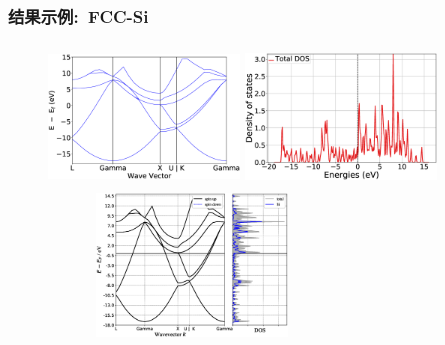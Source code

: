 \documentclass[cjk,slidestop,handout,compress,mathserif,blue]{beamer}	%
\begin{document}
\frame
{
	\frametitle{\textrm{结果示例:~\textrm{FCC-Si}}}
\begin{figure}[h!]
\centering
\vspace*{-0.25in}
\includegraphics[height=1.5in,width=2.0in,viewport=0 0 880 600,clip]{Figures/FCC_Si-Band_pymatgen.eps}
\includegraphics[height=1.5in,width=2.0in,viewport=0 0 880 600,clip]{Figures/FCC_Si-DOS_pymatgen.eps}\\
\includegraphics[height=1.5in,width=3.0in,viewport=0 0 830 550,clip]{Figures/FCC_Si-Band_DOS_pymatgen.eps}
\label{Pymatgen-FCC-Si-Band}
\end{figure} 
}
\end{document}

